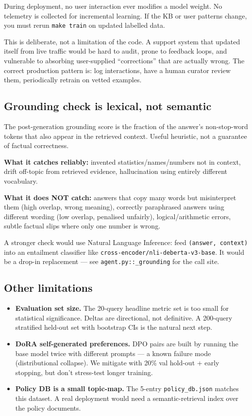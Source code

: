 \documentclass[11pt,a4paper]{article}
\begin{document}
During deployment, no user interaction ever modifies a model weight. No telemetry is collected for incremental learning. If the KB or user patterns change, you must rerun \texttt{make train} on updated labelled data.

This is deliberate, not a limitation of the code. A support system that updated itself from live traffic would be hard to audit, prone to feedback loops, and vulnerable to absorbing user-supplied ``corrections'' that are actually wrong. The correct production pattern is: log interactions, have a human curator review them, periodically retrain on vetted examples.

\subsection{Grounding check is lexical, not semantic}

The post-generation grounding score is the fraction of the answer's non-stop-word tokens that also appear in the retrieved context. Useful heuristic, not a guarantee of factual correctness.

\textbf{What it catches reliably:} invented statistics/names/numbers not in context, drift off-topic from retrieved evidence, hallucination using entirely different vocabulary.

\textbf{What it does NOT catch:} answers that copy many words but misinterpret them (high overlap, wrong meaning), correctly paraphrased answers using different wording (low overlap, penalised unfairly), logical/arithmetic errors, subtle factual slips where only one number is wrong.

A stronger check would use Natural Language Inference: feed \texttt{(answer, context)} into an entailment classifier like \texttt{cross-encoder/nli-deberta-v3-base}. It would be a drop-in replacement --- see \texttt{agent.py::\_grounding} for the call site.

\subsection{Other limitations}

\begin{itemize}[leftmargin=*, itemsep=1pt]
\item \textbf{Evaluation set size.} The 20-query headline metric set is too small for statistical significance. Deltas are directional, not definitive. A 200-query stratified held-out set with bootstrap CIs is the natural next step.
\item \textbf{DoRA self-generated preferences.} DPO pairs are built by running the base model twice with different prompts --- a known failure mode (distributional collapse). We mitigate with 20\% val hold-out + early stopping, but don't stress-test longer training.
\item \textbf{Policy DB is a small topic-map.} The 5-entry \texttt{policy\_db.json} matches this dataset. A real deployment would need a semantic-retrieval index over the policy documents.
\end{itemize}
\end{document}
